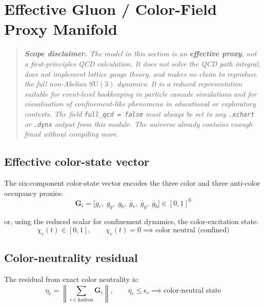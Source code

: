 \documentclass[11pt, a4paper, oneside]{article}
\begin{document}
\section{Effective Gluon / Color-Field Proxy Manifold}
\label{sec:gluon}

\begin{quote}
  \itshape
  \textbf{Scope disclaimer.} The model in this section is an
  \textbf{effective proxy}, not a first-principles QCD calculation.
  It does not solve the QCD path integral, does not implement lattice
  gauge theory, and makes no claim to reproduce the full non-Abelian
  $\mathrm{SU}(3)$ dynamics. It is a reduced representation suitable
  for event-level bookkeeping in particle cascade simulations and for
  visualisation of confinement-like phenomena in educational or
  exploratory contexts. The field \texttt{full\_qcd = false} must always
  be set in any \texttt{.xchart} or \texttt{.dynx} output from this module.
  The universe already contains enough fraud without compiling more.
\end{quote}

\subsection{Effective color-state vector}

The six-component color-state vector encodes the three color and three
anti-color occupancy proxies:
\begin{equation}
  \mathbf{G}_i =
  \bigl[g_r,\; g_g,\; g_b,\; \bar{g}_r,\; \bar{g}_g,\; \bar{g}_b\bigr]
  \in [0,1]^6
  \label{eq:color_vec}
\end{equation}

or, using the reduced scalar for confinement dynamics, the color-excitation
state:
\begin{equation}
  \chi_c(t) \in [0,1],
  \qquad
  \chi_c(t) = 0 \implies \text{color neutral (confined)}
  \label{eq:chi_c}
\end{equation}

\subsection{Color-neutrality residual}

The residual from exact color neutrality is:
\begin{equation}
  \eta_c = \left\| \sum_{i \in \mathrm{hadron}} \mathbf{G}_i \right\|,
  \qquad
  \eta_c \leq \epsilon_c \implies \text{color-neutral state}
  \label{eq:color_residual}
\end{equation}
\end{document}
